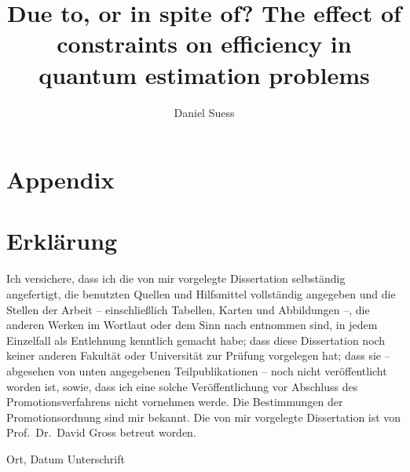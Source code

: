 \documentclass[a4paper,11pt,BCOR=8mm,twoside,headsepline]{scrbook}
\author{Daniel Suess}
\title{Due to, or in spite of? The effect of constraints on efficiency in quantum estimation problems}
\begin{document}
\frontmatter
\maketitle


\tableofcontents
\newpage
\makeatletter
\providecommand\@dotsep{5}
\makeatother
\listoftodos\relax
\newpage

\mainmatter







\appendix

\chapter{Appendix}%




\printbibliography[heading=bibintoc]


\newpage
\chapter*{Erklärung}

Ich versichere, dass ich die von mir vorgelegte Dissertation selbständig angefertigt, die benutzten Quellen und Hilfsmittel vollständig angegeben und die Stellen der Arbeit -- einschließlich Tabellen, Karten und Abbildungen --, die anderen Werken im Wortlaut oder dem Sinn nach entnommen sind, in jedem Einzelfall als Entlehnung kenntlich gemacht habe; dass diese Dissertation noch keiner anderen Fakultät oder Universität zur Prüfung vorgelegen hat; dass sie -- abgesehen von unten angegebenen Teilpublikationen -- noch nicht veröffentlicht worden ist, sowie, dass ich eine solche Veröffentlichung vor Abschluss des Promotionsverfahrens nicht vornehmen werde. 
Die Bestimmungen der Promotionsordnung sind mir bekannt. 
Die von mir vorgelegte Dissertation ist von Prof.\ Dr.\ David Gross betreut worden.

\vspace{4cm}

\hspace{2cm} Ort, Datum \hfill Unterschrift \hspace{2cm}
\end{document}

